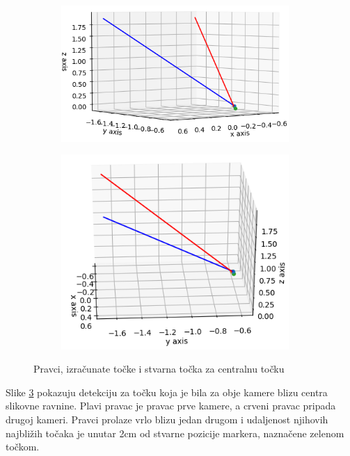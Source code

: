 \documentclass[times, utf8, diplomski]{fer}
\begin{document}
\begin{figure}[h]
\begin{subfigure}[b]{.5\textwidth}
\centering
	\includegraphics[width=0.95\textwidth]{pravci_t7_1}
	\caption*{}
	\label{fig:t7_1}
\end{subfigure}
\begin{subfigure}[b]{.5\textwidth}
	\centering
	\includegraphics[width=0.95\textwidth]{pravci_t7_2}
	\caption*{}
	\label{fig:t7_2}
\end{subfigure}
\caption{Pravci, izračunate točke i stvarna točka za centralnu točku}
\label{fig:t7}
\end{figure}

Slike \ref{fig:t7} pokazuju detekciju za točku koja je bila za obje kamere blizu centra slikovne ravnine. Plavi pravac je pravac prve kamere, a crveni pravac pripada drugoj kameri. Pravci prolaze vrlo blizu jedan drugom i udaljenost njihovih najbližih točaka je unutar 2cm od stvarne pozicije markera, naznačene zelenom točkom. 
\end{document}
